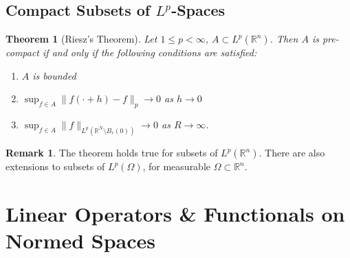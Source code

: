 \documentclass[11pt,a4paper]{article}
\newtheorem{thm}{Theorem}[section]
\theoremstyle{definition}
\newtheorem{rem}{Remark}[section]
\begin{document}
\subsection{Compact Subsets of $L^p$-Spaces}
\begin{thm}[Riesz's Theorem] Let $1 \leq p < \infty$, $A \subset L^p( \mathbb{R}^n)$. Then $A$ is pre-compact if and only if the following conditions are satisfied:
\begin{enumerate}
\item $A$ is bounded 
\item $\displaystyle \sup_{f \in A} \|f( \cdot + h) -f \|_p \to 0$ as $h \to 0$
\item $\displaystyle \sup_{f \in A} \|f\|_{L^p( \mathbb{R}^N \setminus B_r(0)) } \to 0$ as $R \to \infty$.
\end{enumerate}
\end{thm}
\begin{rem} The theorem holds true for subsets of $L^p( \mathbb{R}^n)$. There are also extensions to subsets of $L^p( \Omega)$, for measurable $\Omega \subset \mathbb{R}^n$. 
\end{rem}
\newpage
\section{Linear Operators \& Functionals on Normed Spaces}
\end{document}

